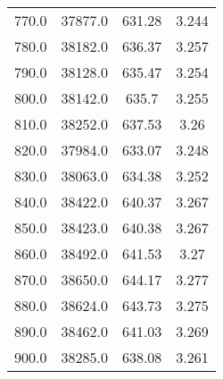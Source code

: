 \begin{table}
\begin{tabular}{cccc}
770.0 & 37877.0 & 631.28 & 3.244 \\
780.0 & 38182.0 & 636.37 & 3.257 \\
790.0 & 38128.0 & 635.47 & 3.254 \\
800.0 & 38142.0 & 635.7 & 3.255 \\
810.0 & 38252.0 & 637.53 & 3.26 \\
820.0 & 37984.0 & 633.07 & 3.248 \\
830.0 & 38063.0 & 634.38 & 3.252 \\
840.0 & 38422.0 & 640.37 & 3.267 \\
850.0 & 38423.0 & 640.38 & 3.267 \\
860.0 & 38492.0 & 641.53 & 3.27 \\
870.0 & 38650.0 & 644.17 & 3.277 \\
880.0 & 38624.0 & 643.73 & 3.275 \\
890.0 & 38462.0 & 641.03 & 3.269 \\
900.0 & 38285.0 & 638.08 & 3.261 \\
\end{tabular}
\end{table}

